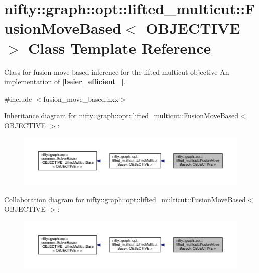 \hypertarget{classnifty_1_1graph_1_1opt_1_1lifted__multicut_1_1FusionMoveBased}{}\section{nifty\+:\+:graph\+:\+:opt\+:\+:lifted\+\_\+multicut\+:\+:Fusion\+Move\+Based$<$ O\+B\+J\+E\+C\+T\+I\+VE $>$ Class Template Reference}
\label{classnifty_1_1graph_1_1opt_1_1lifted__multicut_1_1FusionMoveBased}


Class for fusion move based inference for the lifted multicut objective An implementation of {\bfseries [beier\+\_\+efficient\+\_]}.  




{\ttfamily \#include $<$fusion\+\_\+move\+\_\+based.\+hxx$>$}



Inheritance diagram for nifty\+:\+:graph\+:\+:opt\+:\+:lifted\+\_\+multicut\+:\+:Fusion\+Move\+Based$<$ O\+B\+J\+E\+C\+T\+I\+VE $>$\+:
\nopagebreak
\begin{figure}[H]
\begin{center}
\leavevmode
\includegraphics[width=350pt]{classnifty_1_1graph_1_1opt_1_1lifted__multicut_1_1FusionMoveBased__inherit__graph}
\end{center}
\end{figure}


Collaboration diagram for nifty\+:\+:graph\+:\+:opt\+:\+:lifted\+\_\+multicut\+:\+:Fusion\+Move\+Based$<$ O\+B\+J\+E\+C\+T\+I\+VE $>$\+:
\nopagebreak
\begin{figure}[H]
\begin{center}
\leavevmode
\includegraphics[width=350pt]{classnifty_1_1graph_1_1opt_1_1lifted__multicut_1_1FusionMoveBased__coll__graph}
\end{center}
\end{figure}
